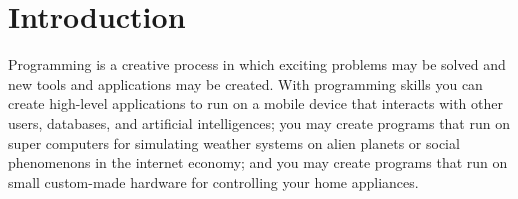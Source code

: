 \chapter{Introduction}
Programming is a creative process in which exciting problems may be solved and new tools and applications may be created. With programming skills you can create high-level applications to run on a mobile device that interacts with other users, databases, and artificial intelligences; you may create programs that run on super computers for simulating weather systems on alien planets or social phenomenons in the internet economy; and you may create programs that run on small custom-made hardware for controlling your home appliances. 

